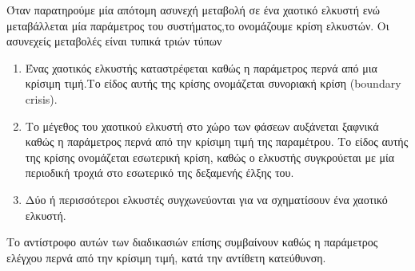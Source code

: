 Όταν παρατηρούμε μία απότομη ασυνεχή μεταβολή σε ένα χαοτικό ελκυστή
ενώ μεταβάλλεται μία παράμετρος του συστήματος,το ονομάζουμε κρίση ελκυστών. 
Οι ασυνεχείς μεταβολές είναι τυπικά τριών τύπων
\begin{enumerate}
\item Ένας χαοτικός ελκυστής καταστρέφεται καθώς η παράμετρος περνά από μια κρίσιμη τιμή.Το είδος αυτής της κρίσης ονομάζεται συνοριακή κρίση (boundary crisis).
\item Το μέγεθος του χαοτικού ελκυστή στο χώρο των φάσεων αυξάνεται ξαφνικά καθώς η παράμετρος περνά από την κρίσιμη τιμή της παραμέτρου. Το είδος αυτής της κρίσης ονομάζεται
εσωτερική κρίση, καθώς ο ελκυστής συγκρούεται με μία περιοδική τροχιά στο εσωτερικό της δεξαμενής έλξης του.
\item Δύο ή περισσότεροι ελκυστές συγχωνεύονται για να σχηματίσουν ένα χαοτικό ελκυστή. 
\end{enumerate}
Το αντίστροφο αυτών των διαδικασιών επίσης συμβαίνουν καθώς η παράμετρος ελέγχου περνά από την κρίσιμη τιμή, κατά την αντίθετη κατεύθυνση.\cite{b5}

